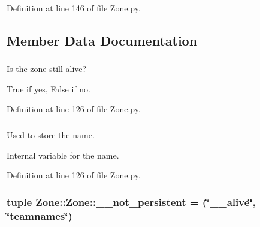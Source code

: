 \-Definition at line 146 of file \-Zone.\-py.



\subsection{\-Member \-Data \-Documentation}
\hypertarget{class_zone_1_1_zone_a8493bff8df9d7129f7cf97d7ae069817}{
\subsubsection[{\-\_\-\-\_\-alive}]{}}
\label{class_zone_1_1_zone_a8493bff8df9d7129f7cf97d7ae069817}


\-Is the zone still alive? 

\-True if yes, \-False if no. 

\-Definition at line 126 of file \-Zone.\-py.

\hypertarget{class_zone_1_1_zone_ad2a884cf2ceb930d1eafe89d3ccab08d}{
\subsubsection[{\-\_\-\-\_\-name}]{}}
\label{class_zone_1_1_zone_ad2a884cf2ceb930d1eafe89d3ccab08d}


\-Used to store the name. 

\-Internal variable for the name. 

\-Definition at line 126 of file \-Zone.\-py.

\hypertarget{class_zone_1_1_zone_ab2019c4e9195c823578aa92959b5d5c5}{
\subsubsection[{\-\_\-\-\_\-not\-\_\-persistent}]{\setlength{\rightskip}{0pt plus 5cm}tuple {\bf \-Zone\-::\-Zone\-::\-\_\-\-\_\-not\-\_\-persistent} = (\char`\"{}\-\_\-\-\_\-alive\char`\"{}, \char`\"{}{\bf teamnames}\char`\"{})}}
\label{class_zone_1_1_zone_ab2019c4e9195c823578aa92959b5d5c5}


